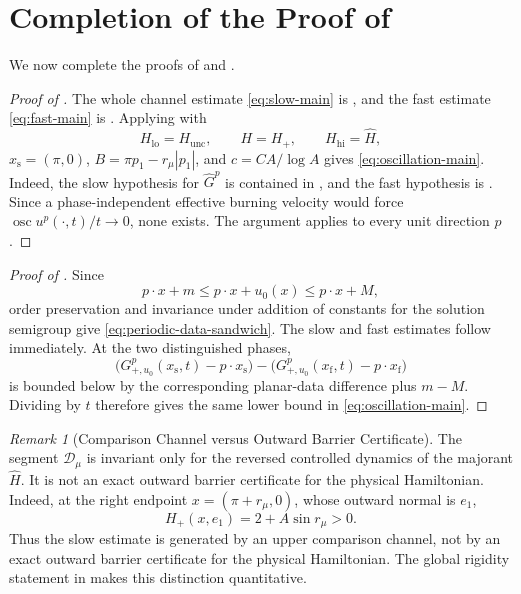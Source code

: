 \documentclass[11pt,reqno,noamsfonts]{amsart}
\theoremstyle{definition}
\theoremstyle{remark}
\newtheorem{remark}[theorem]{Remark}
\newcommand{\osc}{\operatorname{osc}}
\newcommand{\Hunc}{H_{\mathrm{unc}}}
\newcommand{\Hcut}{H_{+}}
\newcommand{\Hhat}{\widehat H}
\begin{document}
\section{Completion of the Proof of }\label{completion}
We now complete the proofs of  and
.

\begin{proof}[Proof of ]
The whole channel estimate \eqref{eq:slow-main} is
, and the fast estimate \eqref{eq:fast-main} is
.  Applying
 with
\[
  H_{\mathrm{lo}}=\Hunc,
  \qquad H=\Hcut,
  \qquad H_{\mathrm{hi}}=\Hhat,
\]
$x_{\mathrm s}=(\pi,0)$,
$B=\pi p_1-r_\mu|p_1|$, and $c=CA/\log A$ gives
\eqref{eq:oscillation-main}.  Indeed, the slow hypothesis for
$\widehat G^p$ is contained in , and the fast
hypothesis is .  Since a phase-independent effective
burning velocity would force
$\osc u^p(\cdot,t)/t\to0$, none exists.  The argument applies to
every unit direction $p$.
\end{proof}

\begin{proof}[Proof of ]
Since
\[
  p\cdot x+m\le p\cdot x+u_0(x)\le p\cdot x+M,
\]
order preservation and invariance under addition of constants for the
solution semigroup give \eqref{eq:periodic-data-sandwich}.  The slow
and fast estimates follow immediately.  At the two distinguished
phases,
\[
  \bigl(G_{+,u_0}^p(x_{\mathrm s},t)-p\cdot x_{\mathrm s}\bigr)
  -\bigl(G_{+,u_0}^p(x_{\mathrm f},t)-p\cdot x_{\mathrm f}\bigr)
\]
is bounded below by the corresponding planar-data difference plus
$m-M$.  Dividing by $t$ therefore gives the same lower bound in
\eqref{eq:oscillation-main}.
\end{proof}

\begin{remark}[Comparison Channel versus Outward Barrier Certificate]
\label{rem:not-barrier}
The segment $\mathcal D_\mu$ is invariant only for the reversed
controlled dynamics of the majorant $\Hhat$.  It is not an exact
outward barrier certificate for the physical Hamiltonian.  Indeed, at
the right endpoint $x=(\pi+r_\mu,0)$, whose outward normal is $e_1$,
\[
  \Hcut(x,e_1)=2+A\sin r_\mu>0.
\]
Thus the slow estimate is generated by an upper comparison channel, not
by an exact outward barrier certificate for the physical Hamiltonian.
The global rigidity statement in  makes this
distinction quantitative.
\end{remark}
\end{document}
